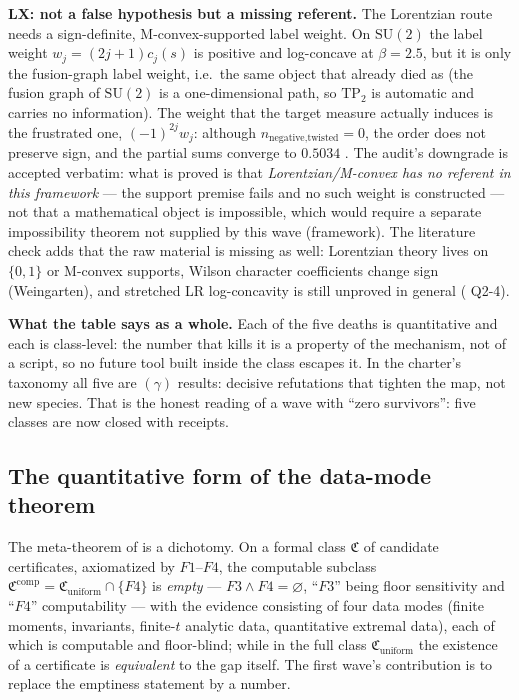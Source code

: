 \textbf{LX: not a false hypothesis but a missing referent.} The Lorentzian route needs a
sign-definite, M-convex-supported label weight. On $\mathrm{SU}(2)$ the label weight
$w_j=(2j+1)c_j(s)$ is positive and log-concave at $\beta=2.5$, but it is only the fusion-graph
label weight, i.e.\ the same object that already died as  (the fusion graph of
$\mathrm{SU}(2)$ is a one-dimensional path, so $\mathrm{TP}_2$ is automatic and carries no
information). The weight that the target measure actually induces is the frustrated one,
$(-1)^{2j}w_j$: although $n_{\text{negative,twisted}}=0$, the order does not preserve sign, and the
partial sums converge to $0.5034$ \LN. The audit's downgrade is accepted verbatim: what is proved
is that \emph{Lorentzian/M-convex has no referent in this framework} --- the support premise fails
and no such weight is constructed --- not that a mathematical object is impossible, which would
require a separate impossibility theorem not supplied by this wave \LN{} (framework). The
literature check adds that the raw material is missing as well: Lorentzian theory lives on
$\{0,1\}$ or M-convex supports, Wilson character coefficients change sign (Weingarten), and
stretched LR log-concavity is still unproved in general ( Q2-4).

\textbf{What the table says as a whole.} Each of the five deaths is quantitative and each is
class-level: the number that kills it is a property of the mechanism, not of a script, so no future
tool built inside the class escapes it. In the charter's taxonomy all five are $(\gamma)$ results:
decisive refutations that tighten the map, not new species. That is the honest reading of a wave
with ``zero survivors'': five classes are now closed with receipts.

\subsection{The quantitative form of the data-mode theorem}

The meta-theorem of  is a dichotomy. On a formal
class $\mathfrak C$ of candidate certificates, axiomatized by $F1$--$F4$, the computable subclass
$\mathfrak C^{\mathrm{comp}}=\mathfrak C_{\mathrm{uniform}}\cap\{F4\}$ is \emph{empty} ---
$F3\wedge F4=\varnothing$, ``$F3$'' being floor sensitivity and ``$F4$'' computability --- with the
evidence consisting of four data modes (finite moments, invariants, finite-$t$ analytic data,
quantitative extremal data), each of which is computable and floor-blind; while in the full class
$\mathfrak C_{\mathrm{uniform}}$ the existence of a certificate is \emph{equivalent} to the gap
itself. The first wave's contribution is to replace the emptiness statement by a number.


